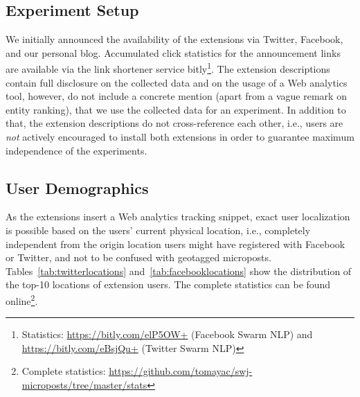 \documentclass{iosart2c}
\begin{document}
\subsection{Experiment Setup}
We initially announced the availability of the extensions via Twitter, Facebook, and our personal blog.
Accumulated click statistics for the announcement links are available via the link shortener service bitly\footnote{Statistics: \url{https://bitly.com/elP5OW+} (Facebook Swarm NLP) and \url{https://bitly.com/eBsjQu+} (Twitter Swarm NLP)}.
The extension descriptions contain full disclosure on the collected data and on the usage of a Web analytics tool, however, do not include a concrete mention (apart from a vague remark on entity ranking), that we use the collected data for an experiment.
In addition to that, the extension descriptions do not cross-reference each other, i.e., users are \emph{not} actively encouraged to install both extensions in order to guarantee maximum independence of the experiments.

\subsection{User Demographics} 
As the extensions insert a Web analytics tracking snippet, exact user localization is possible based on the users' current physical location, i.e., completely independent from the origin location users might have registered with Facebook or Twitter, and not to be confused with geotagged microposts.
Tables~\ref{tab:twitterlocations} and~\ref{tab:facebooklocations} show the distribution of the top-10 locations of extension users. 
The complete statistics can be found \mbox{online}\footnote{Complete statistics: \url{https://github.com/tomayac/swj-microposts/tree/master/stats}}.
\end{document}
